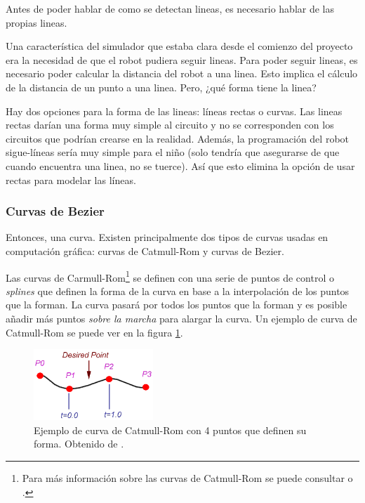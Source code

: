 Antes de poder hablar de como se detectan lineas, es necesario hablar de las propias lineas.

Una característica del simulador que estaba clara desde el comienzo del proyecto era la necesidad de que el robot pudiera seguir lineas. Para poder seguir lineas, es necesario poder calcular la distancia del robot a una linea. Esto implica el cálculo de la distancia de un punto a una linea. Pero, ¿qué forma tiene la linea?

Hay dos opciones para la forma de las lineas: líneas rectas o curvas. Las lineas rectas darían una forma muy simple al circuito y no se corresponden con los circuitos que podrían crearse en la realidad. Además, la programación del robot sigue-líneas sería muy simple para el niño (solo tendría que asegurarse de que cuando encuentra una linea, no se tuerce). Así que esto elimina la opción de usar rectas para modelar las líneas. 


\subsubsection{Curvas de Bezier}
\label{bezier}

Entonces, una curva. Existen principalmente dos tipos de curvas usadas en computación gráfica: curvas de Catmull-Rom y curvas de Bezier. 

Las curvas de Carmull-Rom\footnote{Para más información sobre las curvas de Catmull-Rom se puede consultar \cite{curves-catmull-rom-introduction} o \cite{catmull-rom-splines}.} se definen con una serie de puntos de control o \emph{splines} que definen la forma de la curva en base a la interpolación de los puntos que la forman. La curva pasará por todos los puntos que la forman y es posible añadir más puntos \emph{sobre la marcha} para alargar la curva. Un ejemplo de curva de Catmull-Rom se puede ver en la figura \ref{fig:curva-catmull}.


\begin{figure}[!ht]
	\begin{centering}
		\includegraphics[width=0.4\textwidth]{images/curva-catmull.png}
			\caption{Ejemplo de curva de Catmull-Rom con 4 puntos que definen su forma. Obtenido de \cite{curves-catmull-rom-introduction}.}
				\label{fig:curva-catmull}
	\end{centering}
\end{figure}


